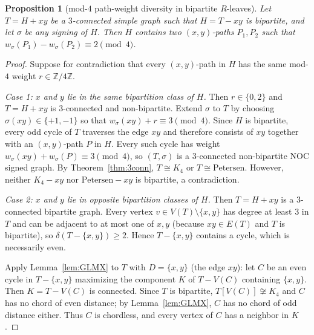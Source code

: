 \documentclass[10pt,letterpaper]{article}
\theoremstyle{zetaplain}
\newtheorem{proposition}[theorem]{Proposition}
\theoremstyle{zetadef}
\theoremstyle{remark}
\numberwithin{equation}{section}
\begin{document}
\begin{proposition}[mod-$4$ path-weight diversity in bipartite $R$-leaves]\label{prop:bipartite}
Let $T = H + xy$ be a $3$-connected simple graph such that $H = T - xy$ is bipartite, and let $\sigma$ be any signing of $H$. Then $H$ contains two $(x, y)$-paths $P_1, P_2$ such that $w_\sigma(P_1) - w_\sigma(P_2) \equiv 2 \pmod 4$.
\end{proposition}

\begin{proof}
Suppose for contradiction that every $(x, y)$-path in $H$ has the same mod-$4$ weight $r \in \mathbb{Z}/4\mathbb{Z}$.

\emph{Case 1: $x$ and $y$ lie in the same bipartition class of $H$.} Then $r \in \{0, 2\}$ and $T = H + xy$ is $3$-connected and non-bipartite. Extend $\sigma$ to $T$ by choosing $\sigma(xy) \in \{+1, -1\}$ so that $w_\sigma(xy) + r \equiv 3 \pmod 4$. Since $H$ is bipartite, every odd cycle of $T$ traverses the edge $xy$ and therefore consists of $xy$ together with an $(x, y)$-path $P$ in $H$. Every such cycle has weight $w_\sigma(xy) + w_\sigma(P) \equiv 3 \pmod 4$, so $(T, \sigma)$ is a $3$-connected non-bipartite NOC signed graph. By Theorem~\ref{thm:3conn}, $T \cong K_4$ or $T \cong \mathrm{Petersen}$. However, neither $K_4 - xy$ nor $\mathrm{Petersen} - xy$ is bipartite, a contradiction.

\emph{Case 2: $x$ and $y$ lie in opposite bipartition classes of $H$.} Then $T = H + xy$ is a $3$-connected bipartite graph. Every vertex $v \in V(T) \setminus \{x, y\}$ has degree at least $3$ in $T$ and can be adjacent to at most one of $x, y$ (because $xy \in E(T)$ and $T$ is bipartite), so $\delta(T - \{x, y\}) \ge 2$. Hence $T - \{x, y\}$ contains a cycle, which is necessarily even.

Apply Lemma~\ref{lem:GLMX} to $T$ with $D = \{x, y\}$ (the edge $xy$): let $C$ be an even cycle in $T - \{x, y\}$ maximizing the component $K$ of $T - V(C)$ containing $\{x, y\}$. Then $K = T - V(C)$ is connected. Since $T$ is bipartite, $T[V(C)] \not\cong K_4$ and $C$ has no chord of even distance; by Lemma~\ref{lem:GLMX}, $C$ has no chord of odd distance either. Thus $C$ is chordless, and every vertex of $C$ has a neighbor in $K$.


\end{proof}
\end{document}
